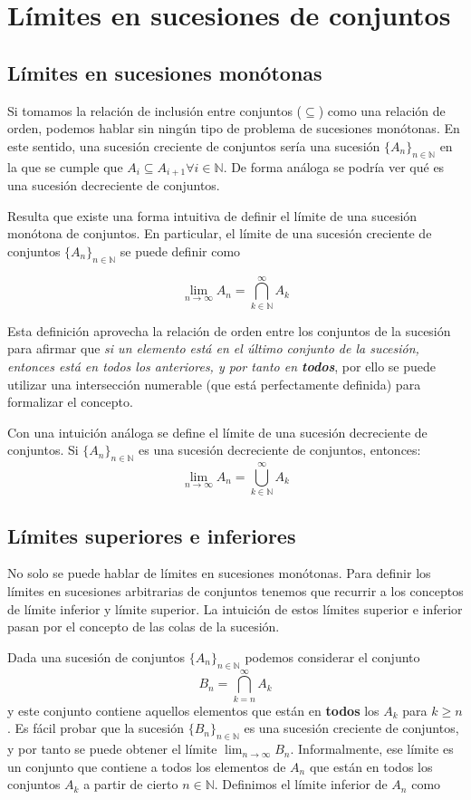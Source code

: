 \documentclass[12pt,a4paper,openright]{book}
\begin{document}
\section{Límites en sucesiones de conjuntos}
\subsection{Límites en sucesiones monótonas}
Si tomamos la relación de inclusión entre conjuntos ($\subseteq$) como una relación de orden, podemos hablar sin ningún tipo de problema de sucesiones monótonas. En este sentido, una sucesión creciente de conjuntos sería una sucesión $\{A_n\}_{n \in \mathbb{N}}$ en la que se cumple que $A_i \subseteq A_{i+1} \forall i \in \mathbb{N}$. De forma análoga se podría ver qué es una sucesión decreciente de conjuntos.

Resulta que existe una forma intuitiva de definir el límite de una sucesión monótona de conjuntos. En particular, el límite de una sucesión creciente de conjuntos $\{A_n\}_{n \in \mathbb{N} }$ se puede definir como 


$$\lim_{n\to\infty} A_n = \bigcap_{k \in \mathbb{N}}^{\infty} A_k$$


Esta definición aprovecha la relación de orden entre los conjuntos de la sucesión para afirmar que \textit{si un elemento está en el último conjunto de la sucesión, entonces está en todos los anteriores, y por tanto en \textbf{todos}}, por ello se puede utilizar una intersección numerable (que está perfectamente definida) para formalizar el concepto.

Con una intuición análoga se define el límite de una sucesión decreciente de conjuntos. Si $\{A_n\}_{n\in\mathbb{N}}$ es una sucesión decreciente de conjuntos, entonces:
$$ \lim_{n\to\infty} A_n = \bigcup_{k\in\mathbb{N}}^{\infty} A_k $$

\subsection{Límites superiores e inferiores}
No solo se puede hablar de límites en sucesiones monótonas. Para definir los límites en sucesiones arbitrarias de conjuntos tenemos que recurrir a los conceptos de límite inferior y límite superior. La intuición de estos límites superior e inferior pasan por el concepto de las colas de la sucesión.

Dada una sucesión de conjuntos $\{A_n\}_{n\in\mathbb{N} }$ podemos considerar el conjunto
$$ B_n = \bigcap_{k=n}^{\infty} A_k $$ 
 y este conjunto contiene aquellos elementos que están en \textbf{todos} los $A_k$ para $k \geq n$. Es fácil probar que la sucesión $\{B_n\}_{n\in\mathbb{N}}$ es una sucesión creciente de conjuntos, y por tanto se puede obtener el límite $\lim_{n\to\infty} B_n$. Informalmente, ese límite es un conjunto que contiene a todos los elementos de $A_n$ que están en todos los conjuntos $A_k$ a partir de cierto $n\in\mathbb{N}$. Definimos el límite inferior de $A_n$ como
\end{document}
